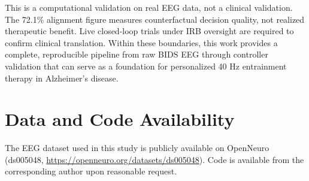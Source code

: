 \documentclass[11pt,letterpaper]{article}
\begin{document}
This is a computational validation on real EEG data, not a clinical validation. The 72.1\% alignment figure measures counterfactual decision quality, not realized therapeutic benefit. Live closed-loop trials under IRB oversight are required to confirm clinical translation. Within these boundaries, this work provides a complete, reproducible pipeline from raw BIDS EEG through controller validation that can serve as a foundation for personalized 40 Hz entrainment therapy in Alzheimer's disease.

\section*{Data and Code Availability}

The EEG dataset used in this study is publicly available on OpenNeuro (ds005048, \url{https://openneuro.org/datasets/ds005048}). Code is available from the corresponding author upon reasonable request.
\end{document}
